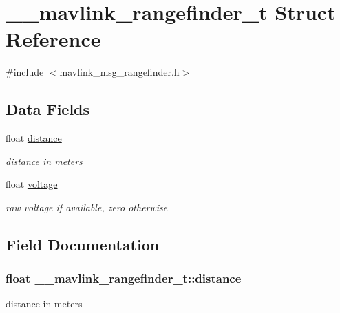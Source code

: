 \hypertarget{struct____mavlink__rangefinder__t}{\section{\+\_\+\+\_\+mavlink\+\_\+rangefinder\+\_\+t Struct Reference}
\label{struct____mavlink__rangefinder__t}
}


{\ttfamily \#include $<$mavlink\+\_\+msg\+\_\+rangefinder.\+h$>$}

\subsection*{Data Fields}
\begin{DoxyCompactItemize}
\item 
float \hyperlink{struct____mavlink__rangefinder__t_a02e39a6e4bf5347a69a0ecd34dcb0dad}{distance}
\begin{DoxyCompactList}\small\item\em distance in meters \end{DoxyCompactList}\item 
float \hyperlink{struct____mavlink__rangefinder__t_ace9c69fef660edd244717ac5fee4f755}{voltage}
\begin{DoxyCompactList}\small\item\em raw voltage if available, zero otherwise \end{DoxyCompactList}\end{DoxyCompactItemize}


\subsection{Field Documentation}
\hypertarget{struct____mavlink__rangefinder__t_a02e39a6e4bf5347a69a0ecd34dcb0dad}{
\subsubsection[{distance}]{\setlength{\rightskip}{0pt plus 5cm}float \+\_\+\+\_\+mavlink\+\_\+rangefinder\+\_\+t\+::distance}}\label{struct____mavlink__rangefinder__t_a02e39a6e4bf5347a69a0ecd34dcb0dad}


distance in meters 

